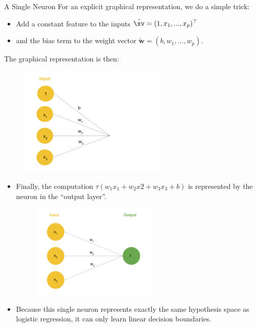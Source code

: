 \begin{vbframe} {A Single Neuron}
For an explicit graphical representation, we do a simple trick: 
\begin{itemize}
\item Add a constant feature to the inputs $\tilde{\xv} = (1, x_1, ..., x_p)^\top$
\item and the bias term to the weight vector $\tilde{\bm{w}} = (b, w_1, ..., w_p)$.
\end{itemize}
The graphical representation is then: 
\begin{figure}
\includegraphics[width=7cm]{figure/neurep_bias.png}
\end{figure}
\framebreak

\begin{itemize}
\item Finally, the computation $\tau(w_1x_1 + w_2x2 + w_3x_3 + b)$ is represented by the neuron in the \enquote{output layer}.
\begin{figure}
\includegraphics[width=6cm]{figure/neurep_three.png}
\end{figure}
\item Because this single neuron represents exactly the same hypothesis space as logistic regression, it can only learn linear decision boundaries.
\framebreak


\end{itemize}
\end{vbframe}
